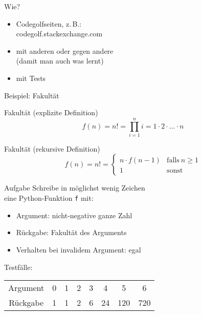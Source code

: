\documentclass[xcolor=dvipsnames, aspectratio=43, 14pt]{beamer}
\begin{document}
\begin{frame}{Wie?}
	\begin{itemize}
		\item Codegolfseiten, z.\,B.:\\
			codegolf.stackexchange.com
		\item mit anderen oder gegen andere\\
			(damit man auch was lernt)
		\item mit Tests
	\end{itemize}
\end{frame}

\begin{frame}{Beispiel: Fakultät}
	\begin{block}{Fakultät (explizite Definition)}
	\[f(n) = n! = \prod_{i=1}^n i = 1·2·…·n\]
	\end{block}
	
	\pause
	
	\begin{block}{Fakultät (rekursive Definition)}
	\[f(n) = n! = \begin{cases}
			n·f(n-1) & \mathrm{falls~} n \geq 1\\
			1 & \mathrm{sonst}
	          
	         \end{cases}\]
	\end{block}
\end{frame}

\begin{frame}{Aufgabe}
	Schreibe in möglichst wenig Zeichen\\ eine Python-Funktion \texttt{f} mit:
	\begin{itemize}
		\item Argument: nicht-negative ganze Zahl
		\item Rückgabe: Fakultät des Arguments
		\item Verhalten bei invalidem Argument: egal
	\end{itemize}
	
	\vfill
	
	Testfälle:\\[0.5\baselineskip]
	\setlength{\tabcolsep}{10pt}
	\renewcommand{\arraystretch}{1.3}
	\begin{tabular}{@{}c|ccccccc}
		Argument & 0 & 1 & 2 & 3 & 4 & 5 & 6 \\
		Rückgabe & 1 & 1 & 2 & 6 & 24 & 120 & 720
	\end{tabular}
\end{frame}
\end{document}
